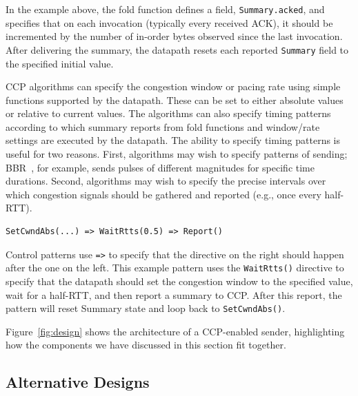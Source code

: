 In the example above, the fold function defines a field, \texttt{Summary.acked}, and specifies that on each invocation (typically every received ACK), it should be incremented by the number of in-order bytes observed since the last invocation. After delivering the summary, the datapath resets each reported \texttt{Summary} field to the specified initial value.
 
 
 CCP algorithms can specify the congestion window or pacing rate using simple functions supported by the datapath. These can be set to either absolute values or relative to current values. The algorithms can also specify timing patterns according to which summary reports from fold functions and window/rate settings are executed by the datapath. 
The ability to specify timing patterns is useful for two reasons. First, algorithms may wish to specify patterns of sending; BBR~\cite{bbr}, for example, sends pulses of different magnitudes for specific time durations. Second, algorithms may wish to specify the precise intervals over which congestion signals should be gathered and reported (e.g., once every half-RTT).
 
\begin{verbatim}
SetCwndAbs(...) => WaitRtts(0.5) => Report()
\end{verbatim}
 
Control patterns use \texttt{=>} to specify that the directive on the right should happen after the one on the left. This example pattern uses the \texttt{WaitRtts()} directive to specify that the datapath should set the congestion window to the specified value, wait for a half-RTT, and then report a summary to CCP. After this report, the pattern will reset Summary state and loop back to \texttt{SetCwndAbs()}.
 
 
Figure~\ref{fig:design} shows the architecture of a CCP-enabled sender, highlighting how the components we have discussed in this section fit together. 



\subsection{Alternative Designs}
\label{sec:design:alternatives}




